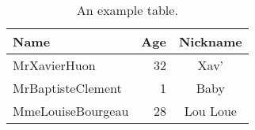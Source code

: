 \begin{table}
	\begin{center}
		\begin{tabular}{|l|r|c|}
			\hline
			Name & Age & Nickname \\
			\hline
			MrXavierHuon & 32 & Xav' \\
			\hline
			MrBaptisteClement & 1 & Baby \\
			\hline
			MmeLouiseBourgeau & 28 & Lou Loue \\
			\hline
		\end{tabular}
	\end{center}
	\caption{An example table.}
	\label{table:example_table}
\end{table}